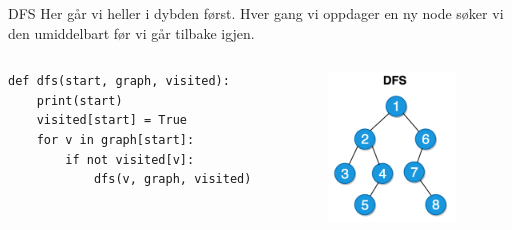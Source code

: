 \begin{frame}[fragile]{DFS}
    Her går vi heller i dybden først. Hver gang vi oppdager en ny node søker vi den umiddelbart før vi går tilbake igjen.
    \begin{columns}
        \begin{column}{0.5\textwidth}
            \begin{verbatim}
def dfs(start, graph, visited):
    print(start)
    visited[start] = True
    for v in graph[start]:
        if not visited[v]:
            dfs(v, graph, visited)
            \end{verbatim}
        \end{column}
        \begin{column}{0.45\textwidth}
            \begin{figure}
                \centering
                \includegraphics[height=4cm]{images/dfs.png}
                \label{fig:bfs}
            \end{figure}   
        \end{column}
    \end{columns}
\end{frame}